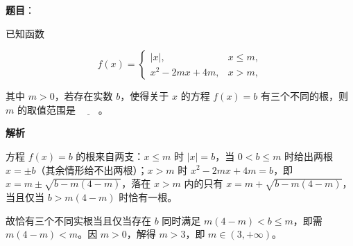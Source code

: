 \begin{answer}

\textbf{题目}：

已知函数

\nopagebreak[4]
\[
f(x)=\begin{cases}|x|, & x\leqslant m,\\x^{2}-2mx+4m, & x>m,\end{cases}
\]

其中 \(m>0\)，若存在实数 \(b\)，使得关于 \(x\) 的方程 \(f(x)=b\) 有三个不同的根，则 \(m\) 的取值范围是 \(\underline{\qquad}\)。

\textbf{解析}

方程 \(f(x)=b\) 的根来自两支：\(x\leqslant m\) 时 \(|x|=b\)，当 \(0<b\leqslant m\) 时给出两根 \(x=\pm b\)（其余情形给不出两根）；\(x>m\) 时 \(x^{2}-2mx+4m=b\)，即 \(x=m\pm\sqrt{b-m(4-m)}\)，落在 \(x>m\) 内的只有 \(x=m+\sqrt{b-m(4-m)}\)，当且仅当 \(b>m(4-m)\) 时恰有一根。

故恰有三个不同实根当且仅当存在 \(b\) 同时满足 \(m(4-m)<b\leqslant m\)，即需 \(m(4-m)<m\)。因 \(m>0\)，解得 \(m>3\)，即 \(m\in(3,+\infty)\)。


\end{answer}
